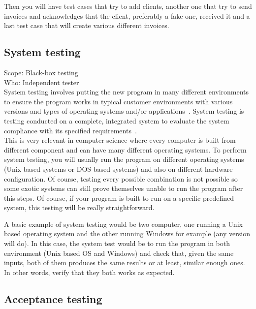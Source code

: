 \documentclass[12pt]{article}
\theoremstyle{definition}
\theoremstyle{definition}
\theoremstyle{remark}
\begin{document}
Then you will have test cases that try to add clients, another one that try to send invoices and acknowledges that the client, preferably a fake one, received it and a last test case that will create various different invoices.


\subsection{System testing}

Scope: Black-box testing\\
Who: Independent tester\\

System testing involves putting the new program in many different environments to ensure the program works in typical customer environments with various versions and types of operating systems and/or applications~\cite{Laurie.W:Black-box}. System testing is testing conducted on a complete, integrated system to evaluate the system compliance with its specified requirements~\cite{IEEEStd1990}.\\

This is very relevant in computer science where every computer is built from different component and can have many different operating systems. To perform system testing, you will usually run the program on different operating systems (Unix based systems or DOS based systems) and also on different hardware configuration. Of course, testing every possible combination is not possible so some exotic systems can still prove themselves unable to run the program after this steps. Of course, if your program is built to run on a specific predefined system, this testing will be really straightforward.

A basic example of system testing would be two computer, one running a Unix based operating system and the other running Windows for example (any version will do). In this case, the system test would be to run the program in both environment (Unix based OS and Windows) and check that, given the same inputs, both of them produces the same results or at least, similar enough ones. In other words, verify that they both works as expected.


\subsection{Acceptance testing}
\end{document}
